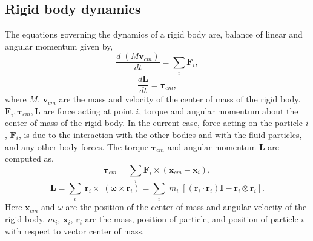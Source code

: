 \documentclass[a4paper,11pt]{book}
\newcommand{\teng}[1]{\ensuremath{\boldsymbol{#1}}}
\newcommand{\ten}[1]{\ensuremath{\mathbf{#1}}}
\begin{document}
\FloatBarrier%
\subsection{Rigid body dynamics}
\label{sec:rbd}



The equations governing the dynamics of a rigid body are, balance of linear and
angular momentum given by,
\begin{equation}
  \label{eq:rfc:balance_linear_mom}
  \frac{d \; (M \ten{v}_{cm})}{d t} = \sum_i \ten{F}_i,
\end{equation}
\begin{equation}
  \label{eq:rfc:balance_angular_mom}
  \frac{d \ten{L}}{d t} = \teng{\tau}_{cm},
\end{equation}
where $M$, $\ten{v}_{cm}$ are the mass and velocity of the center of mass of the rigid body.
$\ten{F}_i, \teng{\tau}_{cm}, \ten{L} $ are force acting at point $i$, torque and
angular momentum about the center of mass of the rigid body. In the current
case, force acting on the particle $i$, $\ten{F}_i$, is due to the interaction
with the other bodies and with the fluid particles, and any other body forces.
The torque $\teng{\tau}_{cm}$ and angular momentum $\ten{L}$ are computed as,
\begin{equation}
  \label{eq:rfc:torque}
 \teng{\tau}_{cm} = \sum_i \ten{F}_i \times (\ten{x}_{cm} - \ten{x}_{i}),
\end{equation}
\begin{equation}
  \label{eq:rfc:moi}
  \teng{L} =
  \sum_i \; \ten{r}_i \times \; (\teng{\omega} \times \ten{r}_i)
  = \sum_i \; m_i \; [(\ten{r}_i \cdot \ten{r}_i) \ten{I} - \ten{r}_i \otimes \ten{r}_i].
\end{equation}
Here $\ten{x}_{cm}$ and $\omega$ are the position of the center of mass and
angular velocity of the rigid body. $m_i$, $\ten{x}_{i}$, $\ten{r}_i$ are the
mass, position of particle, and position of particle $i$ with respect to vector
center of mass.
\end{document}
